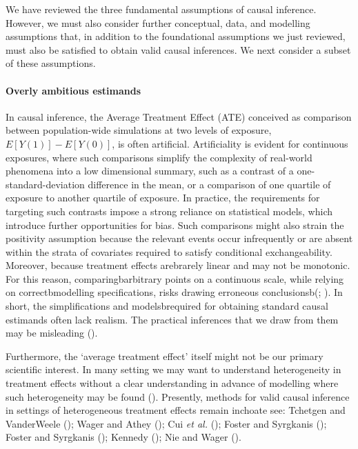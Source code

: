 \documentclass[
  singlecolumn]{article}
\let\oldparagraph\paragraph
\renewcommand{\paragraph}[1]{\oldparagraph{#1}\mbox{}}
\begin{document}
We have reviewed the three fundamental assumptions of causal inference.
However, we must also consider further conceptual, data, and modelling
assumptions that, in addition to the foundational assumptions we just
reviewed, must also be satisfied to obtain valid causal inferences. We
next consider a subset of these assumptions.

\paragraph{Overly ambitious estimands}\label{overly-ambitious-estimands}

In causal inference, the Average Treatment Effect (ATE) conceived as
comparison between population-wide simulations at two levels of
exposure, \(E[Y(1)] - E[Y(0)]\), is often artificial. Artificiality is
evident for continuous exposures, where such comparisons simplify the
complexity of real-world phenomena into a low dimensional summary, such
as a contrast of a one-standard-deviation difference in the mean, or a
comparison of one quartile of exposure to another quartile of exposure.
In practice, the requirements for targeting such contrasts impose a
strong reliance on statistical models, which introduce further
opportunities for bias. Such comparisons might also strain the
positivity assumption because the relevant events occur infrequently or
are absent within the strata of covariates required to satisfy
conditional exchangeability. Moreover, because treatment effects
arebrarely linear and may not be monotonic. For this reason,
comparingbarbitrary points on a continuous scale, while relying on
correctbmodelling specifications, risks drawing erroneous
conclusionsb(;
). In short, the
simplifications and modelsbrequired for obtaining standard causal
estimands often lack realism. The practical inferences that we draw from
them may be misleading ().

Furthermore, the `average treatment effect' itself might not be our
primary scientific interest. In many setting we may want to understand
heterogeneity in treatment effects without a clear understanding in
advance of modelling where such heterogeneity may be found
(). Presently, methods for
valid causal inference in settings of heterogeneous treatment effects
remain inchoate see: Tchetgen and VanderWeele
(); Wager and Athey
(); Cui \emph{et al.}
(); Foster and Syrgkanis
(); Foster and Syrgkanis
(); Kennedy
(); Nie and Wager
().
\end{document}
